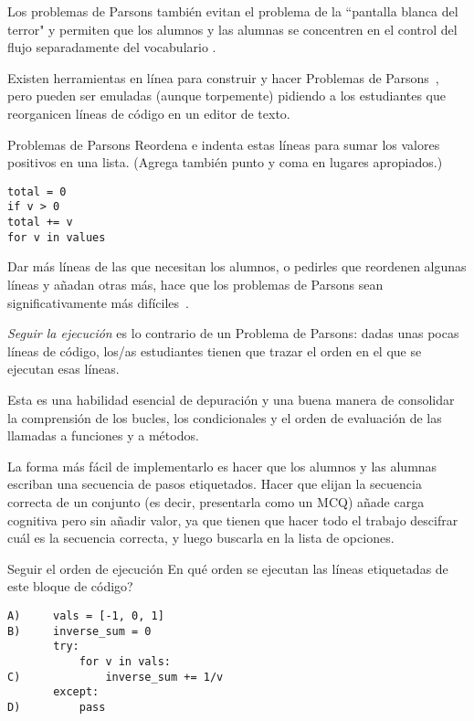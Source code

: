 Los problemas de Parsons  también evitan el problema de la ``pantalla blanca del terror" y permiten que los alumnos y las alumnas se concentren en el control del flujo separadamente del vocabulario \cite{Pars2006,Eric2015,Morr2016,Eric2017}.

Existen herramientas  en línea para construir y hacer Problemas de Parsons~\cite{Ihan2011},
pero pueden ser emuladas (aunque torpemente) 
pidiendo a los estudiantes que reorganicen líneas de código en un editor de texto.

\begin{aside}{Problemas de Parsons}
  Reordena e indenta estas líneas para sumar los valores positivos en una lista.
  (Agrega también punto y coma en lugares apropiados.)

\begin{verbatim}
total = 0
if v > 0
total += v
for v in values
\end{verbatim}
\end{aside}

Dar más líneas de las que necesitan los alumnos, o pedirles que reordenen algunas líneas y añadan otras más, hace que los problemas de Parsons sean significativamente más difíciles~\cite{Harm2016}.

\emph{Seguir la ejecución} es lo contrario de un Problema de Parsons: 
dadas unas pocas líneas de código, 
los/as estudiantes tienen que trazar el orden en el que se ejecutan esas líneas.


Esta es una habilidad esencial de depuración
 y una buena manera de consolidar la comprensión de los bucles, los condicionales y el orden de evaluación de las llamadas a funciones y a métodos.

La forma más fácil de implementarlo es hacer que los alumnos y las alumnas escriban una secuencia de pasos etiquetados.
Hacer que elijan la secuencia correcta de un conjunto 
(es decir, presentarla como un MCQ) 
añade carga cognitiva pero sin añadir valor, 
ya que tienen que hacer todo el trabajo descifrar cuál es la secuencia correcta, y luego buscarla en la lista de opciones.

\begin{aside}{Seguir el orden de ejecución}
  En qué orden se ejecutan las líneas etiquetadas de este bloque de código?

\begin{verbatim}
A)     vals = [-1, 0, 1]
B)     inverse_sum = 0
       try:
           for v in vals:
C)             inverse_sum += 1/v
       except:
D)         pass
\end{verbatim}
\end{aside}

